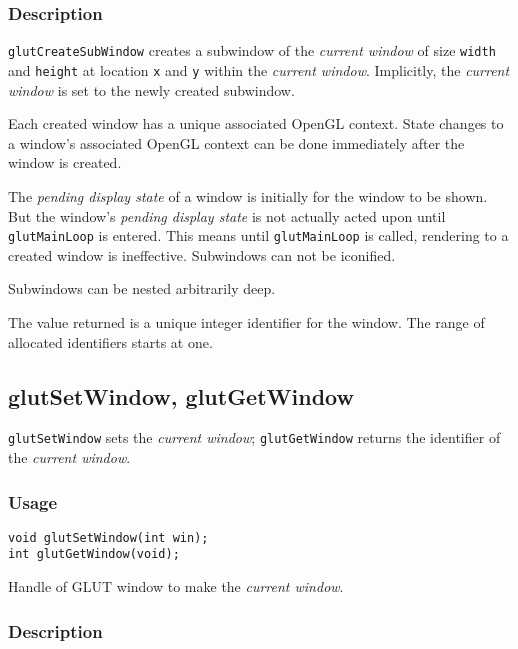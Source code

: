 \subsubsection*{Description}

{\tt glutCreateSubWindow} creates a subwindow of the {\em current window}
of size {\tt width} and {\tt height} at location {\tt x} and {\tt y}
within the {\em current window}.
Implicitly, the {\em current window} is set to the newly created subwindow.

Each created window has a unique associated OpenGL context.  State changes to
a window's associated OpenGL context can be done immediately after the
window is created.

The {\em pending display state} of a window is initially for the window
to be shown.  But the window's {\em pending display state} is not actually
acted upon until {\tt glutMainLoop} is entered.  This means until {\tt glutMainLoop}
is called, rendering to a created window is ineffective.
Subwindows can not be iconified.

Subwindows can be nested arbitrarily deep.

The value returned is a unique integer identifier for the window.  The
range of allocated identifiers starts at one.

\subsection{glutSetWindow, glutGetWindow}

{\tt glutSetWindow} sets the {\em current window}; {\tt glutGetWindow}
returns the identifier of the {\em current window}.

\subsubsection*{Usage}
\begin{verbatim}
void glutSetWindow(int win);
int glutGetWindow(void);
\end{verbatim}
\begin{description}
\itemsep 0in
\item[\tt win]
Handle of GLUT window to make the {\em current window}.
\end{description}

\subsubsection*{Description}

